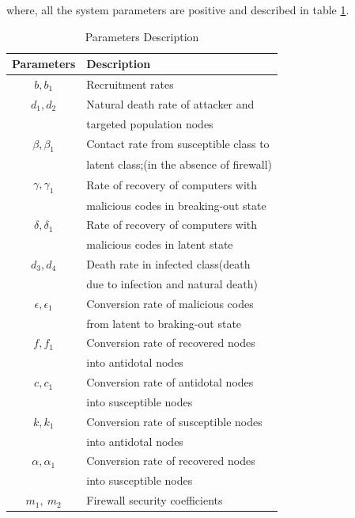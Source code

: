 \documentclass[conference]{IEEEtran}
\begin{document}
\normalsize
\noindent
where, all the system parameters are positive and described in table \ref{newtab}.
\begin{center}
\begin{table}[ht!]
\caption{Parameters Description}\label{newtab}
\begin{tabular}{|c|l|}
  \hline
  \textbf{Parameters} & \textbf{Description }\\
  \hline
  $b,b_1$ & Recruitment rates\\
  \hline
  $d_1,d_2$ & Natural death rate of attacker and \\
  & targeted population nodes\\
  \hline
  $\beta,\beta_1$ & Contact rate from susceptible class to \\
  & latent class;(in the absence of firewall) \\
  \hline
  $\gamma,\gamma_1$ & Rate of recovery of computers with \\
  & malicious codes in breaking-out state \\
  \hline
  $\delta,\delta_1$ & Rate of recovery of computers with \\
  & malicious codes in latent state \\
  \hline
  $d_3,d_4$ & Death rate in infected class(death \\
  & due to infection and natural death) \\
  \hline
  $\epsilon,\epsilon_1$& Conversion rate of malicious codes \\
  & from latent to braking-out state\\
  \hline
  $f,f_1$ & Conversion rate of recovered nodes\\
  & into antidotal nodes \\
  \hline
  $c,c_1$ & Conversion rate of antidotal nodes \\
  & into susceptible nodes \\
  \hline
  $k,k_1$ & Conversion rate of susceptible nodes \\
  & into antidotal nodes \\
  \hline
  $\alpha,\alpha_1$ & Conversion rate of recovered nodes \\
  & into susceptible nodes \\
  \hline
  $m_1, \ m_2$ & Firewall security coefficients\\
  \hline
\end{tabular}
\end{table}
\end{center}
\end{document}
